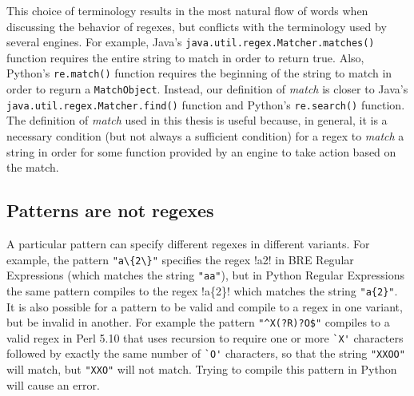 This choice of terminology results in the most natural flow of words when discussing the behavior of regexes, but conflicts with the terminology used by several engines.  For example, Java's {\tt java.util.regex.Matcher.matches()} function requires the entire string to match in order to return true.  Also, Python's {\tt re.match()} function requires the beginning of the string to match in order to regurn a {\tt MatchObject}.  Instead, our definition of \emph{match} is closer to Java's {\tt java.util.regex.Matcher.find()} function and Python's {\tt re.search()} function.  The definition of \emph{match} used in this thesis is useful because, in general, it is a necessary condition (but not always a sufficient condition) for a regex to \emph{match} a string in order for some function provided by an engine to take action based on the match.

\subsection{Patterns are not regexes}
A particular pattern can specify different regexes in different variants.  For example, the pattern \verb!"a\{2\}"! specifies the regex \cverb!a{2}! in BRE Regular Expressions (which matches the string \verb!"aa"!), but in Python Regular Expressions the same pattern compiles to the regex \cverb!a\{2\}! which matches the string \verb!"a{2}"!.  It is also possible for a pattern to be valid and compile to a regex in one variant, but be invalid in another.  For example the pattern \verb!"^X(?R)?O$"! compiles to a valid regex in Perl 5.10 that uses recursion to require one or more \verb!`X'! characters followed by exactly the same number of \verb!`O'! characters, so that the string \verb!"XXOO"! will match, but \verb!"XXO"! will not match.  Trying to compile this pattern in Python will cause an error.












